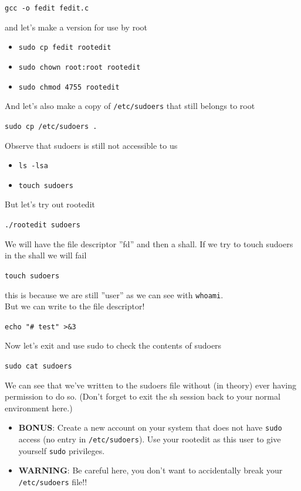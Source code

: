 \documentclass{article}
\begin{document}
\begin{center}
    \lstinline{gcc -o fedit fedit.c}
\end{center}
\noindent and let’s make a version for use by root

\begin{itemize}
    \item \lstinline{sudo cp fedit rootedit}
    \item \lstinline{sudo chown root:root rootedit}
    \item \lstinline{sudo chmod 4755 rootedit}
\end{itemize}
\noindent And let’s also make a copy of \lstinline{/etc/sudoers} that still belongs to root
\begin{center}
    \lstinline{sudo cp /etc/sudoers .}
\end{center}
\noindent Observe that sudoers is still not accessible to us
\begin{itemize}
    \item \lstinline{ls -lsa}
    \item \lstinline{touch sudoers}
\end{itemize}
\noindent But let’s try out rootedit
\begin{center}
    \lstinline{./rootedit sudoers}
\end{center}
\noindent We will have the file descriptor ”fd” and then a shall. If we try to touch
sudoers in the shall we will fail
\begin{center}
    \lstinline{touch sudoers}
\end{center}
this is because we are still ”user” as we can see with \lstinline{whoami}.\\

\noindent But we can write to the file descriptor!
\begin{center}
    \lstinline{echo "# test" >&3}
\end{center}
\noindent Now let’s exit and use sudo to check the contents of sudoers
\begin{center}
    \lstinline{sudo cat sudoers}
\end{center}
\noindent We can see that we’ve written to the sudoers file without (in theory) ever
having permission to do so. (Don’t forget to exit the sh session back to your
normal environment here.)

\begin{itemize}
    \item \textbf{BONUS}: Create a new account on your system that does not have \lstinline{sudo} access (no entry in \lstinline{/etc/sudoers}). Use your rootedit as this user to give yourself \lstinline{sudo} privileges.
    \item \textbf{WARNING}: Be careful here, you don’t want to accidentally break your \lstinline{/etc/sudoers} file!!
\end{itemize} 
\end{document}
